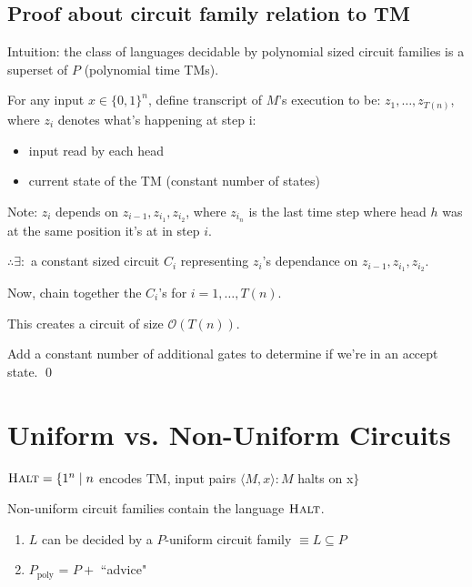 \documentclass[11pt]{article} %
\begin{document}
\subsection{Proof about circuit family relation to TM}

Intuition: the class of languages decidable by polynomial sized circuit families is a superset of $P$ (polynomial time TMs).



 For any input $x \in \{0,1\}^n$, define transcript of $M$'s execution to be: $z_1, \ldots, z_{T(n)}$, where $z_i$ denotes what's happening at step i:
\begin{itemize}
\item input read by each head
\item current state of the TM (constant number of states)
\end{itemize}

Note: $z_i$ depends on $z_{i-1}, z_{i_1}, z_{i_2}$, where $z_{i_n}$ is the last time step where head $h$ was at the same position it's at in step $i$.

$\therefore \exists : $ a constant sized circuit $C_i$ representing $z_i$'s dependance on $z_{i-1}, z_{i_1}, z_{i_2}$.

Now, chain together the $C_i$'s for $i=1,\ldots,T(n)$.

This creates a circuit of size $\mathcal{O}(T(n))$.

Add a constant number of additional gates to determine if we're in an accept state. \qed

\section{Uniform vs. Non-Uniform Circuits}

$\textsc{Halt} = \{1^n \mid n$ encodes TM, input pairs $\langle M, x  \rangle : M$ halts on x$ \}$

Non-uniform circuit families contain the language $\textsc{Halt}$.


\begin{enumerate}
\item $L$ can be decided by a $P$-uniform circuit family $\equiv L \subseteq P$
\item $P_{\text{poly}}$ = $P + $ ``advice"
\end{enumerate}
\end{document}
